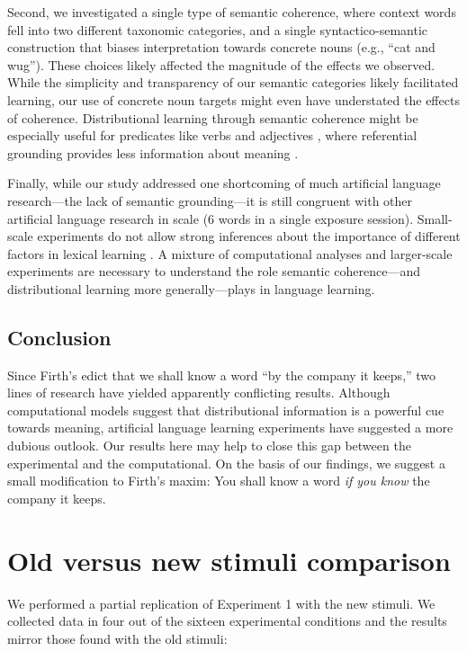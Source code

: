 \documentclass[man,floatsintext]{apa6}
\begin{document}
Second, we investigated a single type of semantic coherence, where context words fell into two different taxonomic categories, and a single syntactico-semantic construction that biases interpretation towards concrete nouns (e.g., ``cat and wug''). These choices likely affected the magnitude of the effects we observed. While the simplicity and transparency of our semantic categories likely facilitated learning, our use of concrete noun targets might even have understated the effects of coherence. Distributional learning through semantic coherence might be especially useful for predicates like verbs and adjectives \citep{redington1998}, where referential grounding provides less information about meaning \citep{gleitman1990}.

Finally, while our study addressed one shortcoming of much artificial language research---the lack of semantic grounding---it is still congruent with other artificial language research in scale (6 words in a single exposure session). Small-scale experiments do not allow strong inferences about the importance of different factors in lexical learning \citep{romberg2010, frank2013}. A mixture of computational analyses and larger-scale experiments are necessary to understand the role semantic coherence---and distributional learning more generally---plays in language learning.

\subsection{Conclusion}
Since Firth's edict that we shall know a word ``by the company it keeps,'' two lines of research have yielded apparently conflicting results. Although computational models suggest that distributional information is a powerful cue towards meaning, artificial language learning experiments have suggested a more dubious outlook. Our results here may help to close this gap between the experimental and the computational. On the basis of our findings, we suggest a small modification to Firth's maxim: You shall know a word \emph{if you know} the company it keeps.

\newpage



\appendix
\section{Old versus new stimuli comparison}
\label{old-vs-new}

We performed a partial replication of Experiment 1 with the new stimuli. We collected data in four out of the sixteen experimental conditions and the results mirror those found with the old stimuli:
\end{document}
